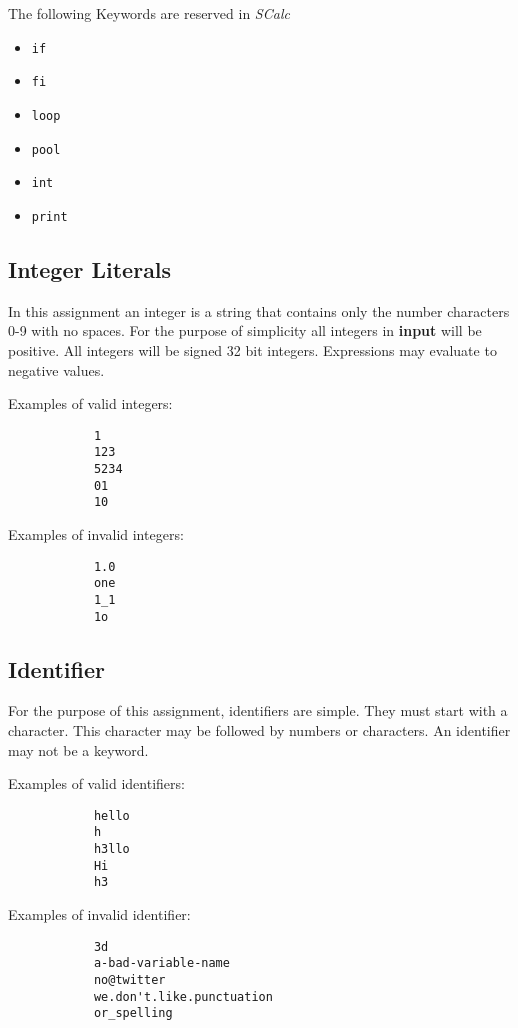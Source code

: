 \documentclass{article}
\newcommand{\code}[1]{\texttt{\textmd{#1}}}
\begin{document}
		The following Keywords are reserved in \textit{SCalc}

		\begin {itemize}
			\item{\code{if}}
			\item{\code{fi}}
			\item{\code{loop}}
			\item{\code{pool}}
			\item{\code{int}}
			\item{\code{print}}
		\end {itemize}


	\subsection {Integer Literals}

		In this assignment an integer is a string that contains only the number characters 0-9 with no
		spaces. For the purpose of simplicity all integers in \textbf{input} will be positive. All integers will be
		signed 32 bit integers. Expressions may evaluate to negative values.
		
		Examples of valid integers:

		\begin{lstlisting}
			1
			123
			5234
			01
			10
		\end{lstlisting}
		
		Examples of invalid integers:

		\begin{lstlisting}
			1.0
			one
			1_1
			1o
		\end{lstlisting}
	
	
	\subsection{Identifier}

		For the purpose of this assignment, identifiers are simple. They must start with a character. This character may be followed by
		numbers or characters. An identifier may not be a keyword.
		
		Examples of valid identifiers:

		\begin{lstlisting}
			hello
			h
			h3llo
			Hi
			h3
		\end{lstlisting}

		Examples of invalid identifier:

		\begin{lstlisting}
			3d
			a-bad-variable-name
			no@twitter
			we.don't.like.punctuation
			or_spelling
		\end{lstlisting}
	
\end{document}
